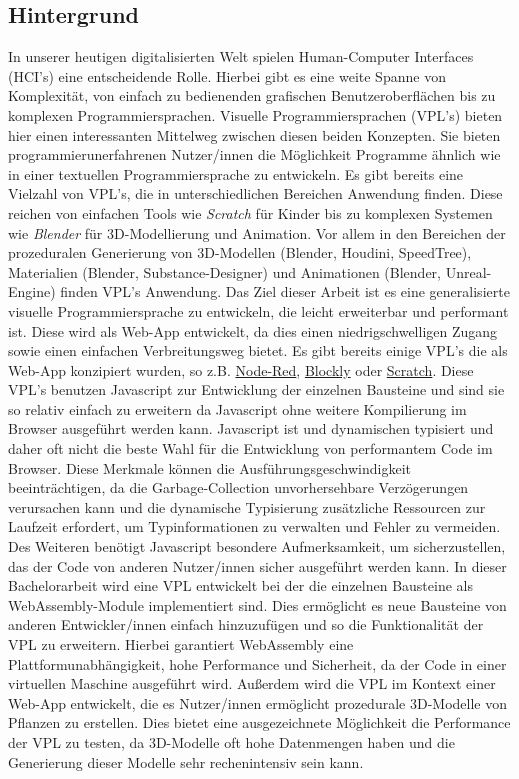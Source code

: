\documentclass[ngerman]{article}
\begin{document}
\subsection{Hintergrund}
In unserer heutigen digitalisierten Welt spielen Human-Computer Interfaces (HCI's) eine entscheidende Rolle.
Hierbei gibt es eine weite Spanne von Komplexität, von einfach zu bedienenden grafischen Benutzeroberflächen bis zu komplexen Programmiersprachen. 
\br
Visuelle Programmiersprachen (VPL's) bieten hier einen interessanten Mittelweg zwischen diesen beiden Konzepten. Sie bieten programmierunerfahrenen Nutzer/innen die Möglichkeit Programme ähnlich wie in einer textuellen Programmiersprache zu entwickeln.
\br
Es gibt bereits eine Vielzahl von VPL's, die in unterschiedlichen Bereichen Anwendung finden. 
Diese reichen von einfachen Tools wie \textit{Scratch} für Kinder bis zu komplexen Systemen wie \textit{Blender} für 3D-Modellierung und Animation. Vor allem in den Bereichen der prozeduralen Generierung von 3D-Modellen (Blender, Houdini, SpeedTree), Materialien (Blender, Substance-Designer) und Animationen (Blender, Unreal-Engine) finden VPL's Anwendung.
\br
Das Ziel dieser Arbeit ist es eine generalisierte visuelle Programmiersprache zu entwickeln, die leicht erweiterbar und performant ist.
Diese wird als Web-App entwickelt, da dies einen niedrigschwelligen Zugang sowie einen einfachen Verbreitungsweg bietet.
\br
Es gibt bereits einige VPL's die als Web-App konzipiert wurden, so z.B. \href{https://nodered.org}{Node-Red},
\href{https://developers.google.com/blockly}{Blockly} oder \href{https://scratch.mit.edu/}{Scratch}. Diese VPL's benutzen Javascript zur Entwicklung der einzelnen Bausteine und sind sie so relativ einfach zu erweitern da Javascript ohne weitere Kompilierung im Browser ausgeführt werden kann. 
Javascript ist  und dynamischen typisiert und daher oft nicht die beste Wahl für die Entwicklung von performantem Code im Browser. Diese Merkmale können die Ausführungsgeschwindigkeit beeinträchtigen, da die Garbage-Collection unvorhersehbare Verzögerungen verursachen kann und die dynamische Typisierung zusätzliche Ressourcen zur Laufzeit erfordert, um Typinformationen zu verwalten und Fehler zu vermeiden.
Des Weiteren benötigt Javascript besondere Aufmerksamkeit, um sicherzustellen, das der Code von anderen Nutzer/innen sicher ausgeführt werden kann.
\br
In dieser Bachelorarbeit wird eine VPL entwickelt bei der die einzelnen Bausteine als WebAssembly-Module implementiert sind. 
Dies ermöglicht es neue Bausteine von anderen Entwickler/innen einfach hinzuzufügen und so die Funktionalität der VPL zu erweitern.
Hierbei garantiert WebAssembly eine Plattformunabhängigkeit, hohe Performance und Sicherheit, da der Code in einer virtuellen Maschine ausgeführt wird. \cite{Haas2017}
\br
Außerdem wird die VPL im Kontext einer Web-App entwickelt, die es Nutzer/innen ermöglicht prozedurale 3D-Modelle von Pflanzen zu erstellen. 
Dies bietet eine ausgezeichnete Möglichkeit die Performance der VPL zu testen, da 3D-Modelle oft hohe Datenmengen haben und die Generierung dieser Modelle sehr rechenintensiv sein kann.
\end{document}
